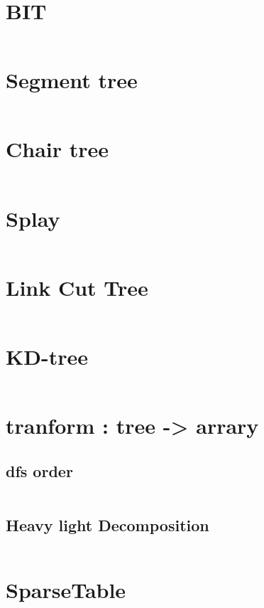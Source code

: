 \documentclass[a4paper,10pt]{article}
\begin{document}
		\section{BIT}
			\inputminted[breaklines]{c++}{Date_structure/BIT.cc}
			
		\section{Segment tree}
			\inputminted[breaklines]{c++}{Date_structure/Segment_tree.cc}
			
		\section{Chair tree}
			\inputminted[breaklines]{c++}{Date_structure/Chair_tree.cc}
			
		\section{Splay}
			\inputminted[breaklines]{c++}{Date_structure/Splay.cc}
           
		\section{Link Cut Tree}
            \inputminted[breaklines]{c++}{Date_structure/lct.cc}
        \newpage
		\section{KD-tree}
			\inputminted[breaklines]{c++}{Date_structure/KD-tree.cc}
			
		\section{tranform : tree -> arrary}
			\subsection{dfs order}
				\inputminted[breaklines]{c++}{Date_structure/dfs_order.cc}
			\subsection{Heavy light Decomposition}
				\inputminted[breaklines]{c++}{Date_structure/Heavy_light_Decomposition.cc}
		\section{SparseTable}
			\inputminted[breaklines]{c++}{Date_structure/SparseTable.cc}
    
\end{document}
